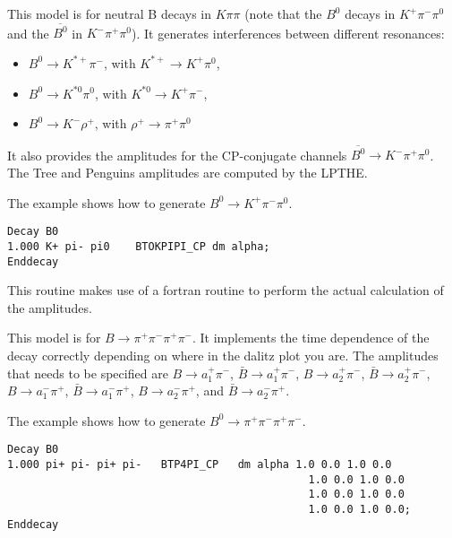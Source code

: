 

\Expl
This model is for neutral B decays in $K \pi\pi$ (note that the 
$B^0$ decays in $K^+ \pi^- \pi^0$ and the $\overline{B^0}$ in
$K^- \pi^+ \pi^0$). It generates interferences between different resonances:
\begin{itemize}
\item{} $  B^0 \rightarrow K^{*+} \pi^- $, 
                       with $K^{*+} \rightarrow K^+ \pi^0$,
\item{} $  B^0 \rightarrow {K^{*0}} \pi^0 $, 
                       with ${K^{*0}} \rightarrow K^+ \pi^-$,
\item{} $  B^0 \rightarrow K^- \rho^{+} $, 
                       with $\rho^{+} \rightarrow \pi^+ \pi^0$
\end{itemize}
It also provides the amplitudes for the CP-conjugate channels
$\overline{B^0} \rightarrow K^- \pi^+ \pi^0$.
The Tree and Penguins amplitudes are computed by the LPTHE.

\Example
\noindent The example shows how to generate $B^0 \rightarrow K^+\pi^-\pi^0$.
\begin{verbatim}
Decay B0
1.000 K+ pi- pi0    BTOKPIPI_CP dm alpha;
Enddecay
\end{verbatim}

\Notes
This routine makes use of a fortran routine to perform the 
actual calculation of the amplitudes.


\label{bto4picp}



\Expl
This model is for $B\rightarrow \pi^+\pi^-\pi^+\pi^-$. It implements the
time dependence of the decay correctly depending on where in the
dalitz plot you are. The amplitudes that needs to be specified are
$B\rightarrow a_1^+ \pi^-$, $\bar B\rightarrow a_1^+ \pi^-$,
$B\rightarrow a_2^+ \pi^-$, $\bar B\rightarrow a_2^+ \pi^-$,
$B\rightarrow a_1^- \pi^+$, $\bar B\rightarrow a_1^- \pi^+$,
$B\rightarrow a_2^- \pi^+$, and $\bar B\rightarrow a_2^- \pi^+$.

\Example
The example shows how to generate $B^0 \rightarrow \pi^+\pi^-\pi^+\pi^-$.
\begin{verbatim}
Decay B0
1.000 pi+ pi- pi+ pi-   BTP4PI_CP   dm alpha 1.0 0.0 1.0 0.0
                                               1.0 0.0 1.0 0.0
                                               1.0 0.0 1.0 0.0
                                               1.0 0.0 1.0 0.0;
Enddecay
\end{verbatim}

